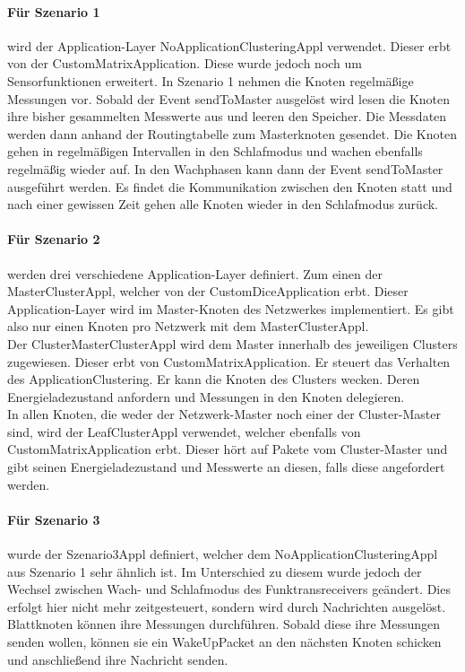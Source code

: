 \paragraph{Für Szenario 1} wird der Application-Layer NoApplicationClusteringAppl verwendet. Dieser erbt von der CustomMatrixApplication. Diese wurde jedoch noch um Sensorfunktionen erweitert. In Szenario 1 nehmen die Knoten regelmäßige Messungen vor. Sobald der Event sendToMaster ausgelöst wird lesen die Knoten ihre bisher gesammelten Messwerte aus und leeren den Speicher. Die Messdaten werden dann anhand der Routingtabelle zum Masterknoten gesendet. Die Knoten gehen in regelmäßigen Intervallen in den Schlafmodus und wachen ebenfalls regelmäßig wieder auf. In den Wachphasen kann dann der Event sendToMaster ausgeführt werden. Es findet die Kommunikation zwischen den Knoten statt und nach einer gewissen Zeit gehen alle Knoten wieder in den Schlafmodus zurück.

\paragraph{Für Szenario 2} werden drei verschiedene Application-Layer definiert. Zum einen der MasterClusterAppl, welcher von der CustomDiceApplication erbt. Dieser Application-Layer wird im Master-Knoten des Netzwerkes implementiert. Es gibt also nur einen Knoten pro Netzwerk mit dem MasterClusterAppl.\\
Der ClusterMasterClusterAppl wird dem Master innerhalb des jeweiligen Clusters zugewiesen. Dieser erbt von CustomMatrixApplication. Er steuert das Verhalten des ApplicationClustering. Er kann die Knoten des Clusters wecken. Deren Energieladezustand anfordern und Messungen in den Knoten delegieren.\\
In allen Knoten, die weder der Netzwerk-Master noch einer der Cluster-Master sind, wird der LeafClusterAppl verwendet, welcher ebenfalls von CustomMatrixApplication erbt. Dieser hört auf Pakete vom Cluster-Master und gibt seinen Energieladezustand und Messwerte an diesen, falls diese angefordert werden.

\paragraph{Für Szenario 3} wurde der Szenario3Appl definiert, welcher dem NoApplicationClusteringAppl aus Szenario 1 sehr ähnlich ist. Im Unterschied zu diesem wurde jedoch der Wechsel zwischen Wach- und Schlafmodus des Funktransreceivers geändert. Dies erfolgt hier nicht mehr zeitgesteuert, sondern wird durch Nachrichten ausgelöst.\\
Blattknoten können ihre Messungen durchführen. Sobald diese ihre Messungen senden wollen, können sie ein WakeUpPacket an den nächsten Knoten schicken und anschließend ihre Nachricht senden.

